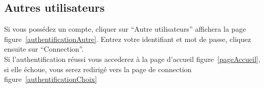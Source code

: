 \documentclass[a4paper,11pt,final]{report}
\begin{document}
\noindent\begin{minipage}{\linewidth}%
\label{authentificationCAS}
\end{minipage}

\subsection{Autres utilisateurs}
Si vous possédez un compte, cliquer sur ``Autre utilisateurs'' affichera la page figure~\ref{authentificationAutre}. Entrez votre identifiant et mot de passe, cliquez ensuite sur ``Connection''.\\
Si l'authentification réussi vous accederez à la page d'accueil figure~\ref{pageAccueil}, si elle échoue, vous serez redirigé vers la page de connection figure~\ref{authentificationChoix}

\noindent\begin{minipage}{\linewidth}%
\label{authentificationAutre}
\end{minipage}
\end{document}
